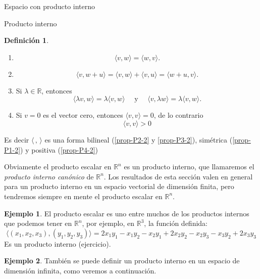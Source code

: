 \documentclass[a4paper,12pt,twoside,spanish,reqno]{amsbook}
\theoremstyle{definition}
\newtheorem{definicion}{Definici\'on}[section]
\newtheorem{ejemplo}{Ejemplo}[section]
\theoremstyle{remark}
\newcommand{\la}{\langle}
\newcommand{\ra}{\rangle}
\newcommand{\R}{\mathbb R}
\begin{document}
\begin{chapter}{Espacio con producto interno}
\begin{section}{Producto interno}
\begin{definicion}
			\begin{enumerate}[label=\textbf{P\arabic*.},ref=P\arabic*]
				\item\label{prop-P1-2}
				\begin{equation*}
					\langle v , w \rangle = \langle w , v \rangle.
				\end{equation*} 	
				\item\label{prop-P2-2} 
				\begin{equation*}
				\langle v , w + u \rangle =\langle v , w \rangle + \langle v , u \rangle = \langle w +u , v \rangle.
				\end{equation*}
				\item\label{prop-P3-2}  Si $\lambda \in \R$, entonces 
				\begin{equation*}
				\langle \lambda v , w \rangle = \lambda \langle v , w \rangle \quad \text{ y } \quad  \langle v , \lambda w \rangle = \lambda \langle v , w \rangle.
				\end{equation*}
				\item\label{prop-P4-2} Si $v=0$ es el vector cero, entonces $\langle v , v \rangle =0$,  de lo contrario
				\begin{equation*}
				\langle v , v \rangle >0
				\end{equation*}
			\end{enumerate}
			Es decir  $\la \,,\,\ra$ es una forma bilineal (\ref{prop-P2-2} y \ref{prop-P3-2}),  simétrica (\ref{prop-P1-2}) y positiva (\ref{prop-P4-2})
		\end{definicion}
	
		
		Obviamente el producto escalar en $\R^n$  es un producto interno,  que llamaremos  el  \textit{producto interno canónico} de $\R^n$. Los resultados de esta sección valen en general para un producto interno en un espacio vectorial de dimensión finita, pero tendremos siempre en mente el producto escalar en $\R^n$. 

			\begin{ejemplo} El producto escalar es uno entre  muchos de los productos internos que podemos tener en $\R^n$, por ejemplo,  en $\R^3$,  la función definida:
				\begin{equation*}
					\langle (x_1,x_2,x_3) , (y_1,y_2,y_3)\rangle =2x_1y_1-x_1y_2-x_2y_1+2x_2y_2-x_2y_3-x_3y_2+2x_3y_3
				\end{equation*}
				Es un producto interno (ejercicio).
			\end{ejemplo}
		
		\begin{ejemplo} También  se puede definir un producto interno en un espacio de dimensión infinita, como veremos a continuación.
			

\end{ejemplo}
\end{section}
\end{chapter}
\end{document}
